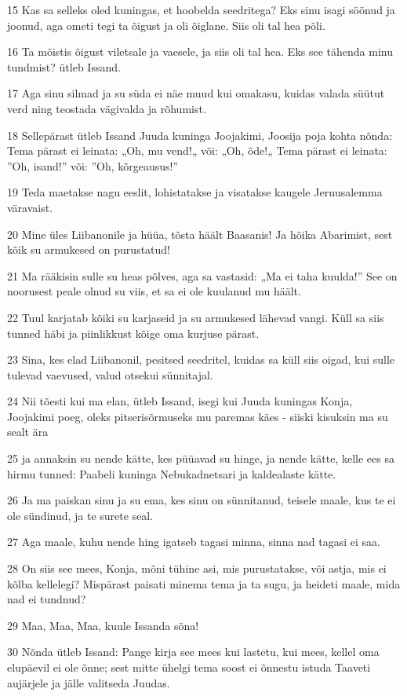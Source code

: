 \par 15 Kas sa selleks oled kuningas, et hoobelda seedritega? Eks sinu isagi söönud ja joonud, aga ometi tegi ta õigust ja oli õiglane. Siis oli tal hea põli.
\par 16 Ta mõistis õigust viletsale ja vaesele, ja siis oli tal hea. Eks see tähenda minu tundmist? ütleb Issand.
\par 17 Aga sinu silmad ja su süda ei näe muud kui omakasu, kuidas valada süütut verd ning teostada vägivalda ja rõhumist.
\par 18 Sellepärast ütleb Issand Juuda kuninga Joojakimi, Joosija poja kohta nõnda: Tema pärast ei leinata: „Oh, mu vend!„ või: „Oh, õde!„ Tema pärast ei leinata: ”Oh, isand!” või: ”Oh, kõrgeausus!”
\par 19 Teda maetakse nagu eeslit, lohistatakse ja visatakse kaugele Jeruusalemma väravaist.
\par 20 Mine üles Liibanonile ja hüüa, tõsta häält Baasanis! Ja hõika Abarimist, sest kõik su armukesed on purustatud!
\par 21 Ma rääkisin sulle su heas põlves, aga sa vastasid: „Ma ei taha kuulda!” See on noorusest peale olnud su viis, et sa ei ole kuulanud mu häält.
\par 22 Tuul karjatab kõiki su karjaseid ja su armukesed lähevad vangi. Küll sa siis tunned häbi ja piinlikkust kõige oma kurjuse pärast.
\par 23 Sina, kes elad Liibanonil, pesitsed seedritel, kuidas sa küll siis oigad, kui sulle tulevad vaevused, valud otsekui sünnitajal.
\par 24 Nii tõesti kui ma elan, ütleb Issand, isegi kui Juuda kuningas Konja, Joojakimi poeg, oleks pitserisõrmuseks mu paremas käes - siiski kisuksin ma su sealt ära
\par 25 ja annaksin su nende kätte, kes püüavad su hinge, ja nende kätte, kelle ees sa hirmu tunned: Paabeli kuninga Nebukadnetsari ja kaldealaste kätte.
\par 26 Ja ma paiskan sinu ja su ema, kes sinu on sünnitanud, teisele maale, kus te ei ole sündinud, ja te surete seal.
\par 27 Aga maale, kuhu nende hing igatseb tagasi minna, sinna nad tagasi ei saa.
\par 28 On siis see mees, Konja, mõni tühine asi, mis purustatakse, või astja, mis ei kõlba kellelegi? Mispärast paisati minema tema ja ta sugu, ja heideti maale, mida nad ei tundnud?
\par 29 Maa, Maa, Maa, kuule Issanda sõna!
\par 30 Nõnda ütleb Issand: Pange kirja see mees kui lastetu, kui mees, kellel oma elupäevil ei ole õnne; sest mitte ühelgi tema soost ei õnnestu istuda Taaveti aujärjele ja jälle valitseda Juudas.

